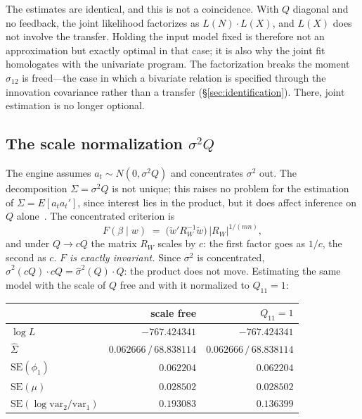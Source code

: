 \documentclass[11pt,a4paper]{article}
\theoremstyle{plain}
\theoremstyle{remark}
\begin{document}
The estimates are identical, and this is not a coincidence. With $Q$ diagonal and
no feedback, the joint likelihood factorizes as $L(N)\cdot L(X)$, and $L(X)$ does
not involve the transfer. Holding the input model fixed is therefore not an
approximation but exactly optimal in that case; it is also why the joint fit
homologates with the univariate program. The factorization breaks the moment
$\sigma_{12}$ is freed---the case in which a bivariate relation is specified
through the innovation covariance rather than a transfer (\S\ref{sec:identification}).
There, joint estimation is no longer optional.

\subsection{The scale normalization $\sigma^2 Q$}
\label{sec:qq}

The engine assumes $a_t \sim N(0,\sigma^2 Q)$ and concentrates $\sigma^2$ out. The
decomposition $\Sigma=\sigma^2 Q$ is not unique; this raises no problem for the
estimation of $\Sigma=E[a_t a_t']$, since interest lies in the product, but it does
affect inference on $Q$ alone~\cite[p.~474]{mauricio2002}. The concentrated
criterion is~\cite[eq.~12]{mauricio2002}
\begin{equation}
F(\beta\mid w) \;=\; \bigl(\tilde{w}' R_W^{-1}\tilde{w}\bigr)\,
                     |R_W|^{1/(mn)},
\label{eq:crit}
\end{equation}
and under $Q\to cQ$ the matrix $R_W$ scales by $c$: the first factor goes as
$1/c$, the second as $c$. \emph{$F$ is exactly invariant.} Since $\sigma^2$ is
concentrated, $\hat\sigma^2(cQ)\cdot cQ = \hat\sigma^2(Q)\cdot Q$: the product
does not move. Estimating the same model with the scale of $Q$ free and with it
normalized to $Q_{11}=1$:

\begin{center}
\begin{tabular}{lrr}
\toprule
 & scale free & $Q_{11}=1$ \\
\midrule
$\log L$                         & $-767.424341$ & $-767.424341$ \\
$\hat\Sigma$                     & $0.062666 \,/\, 68.838114$ & $0.062666 \,/\, 68.838114$ \\
$\mathrm{SE}(\phi_1)$            & $0.062204$ & $0.062204$ \\
$\mathrm{SE}(\mu)$               & $0.028502$ & $0.028502$ \\
$\mathrm{SE}(\log \mathrm{var}_2/\mathrm{var}_1)$ & $\mathbf{0.193083}$ & $\mathbf{0.136399}$ \\
\bottomrule
\end{tabular}
\end{center}
\end{document}

